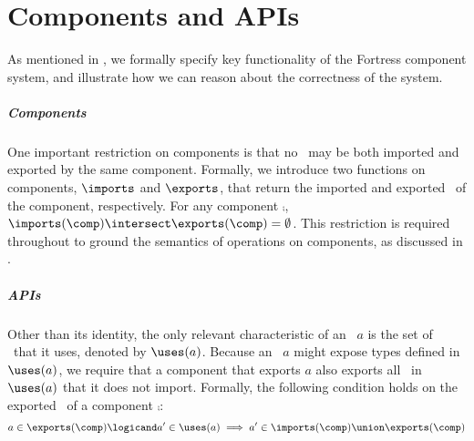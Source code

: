 %
%
%
%

\renewcommand{\api}{a}
\chapter{Components and APIs}


As mentioned in , 
we formally specify key functionality of the Fortress component system,
and illustrate how we can reason about the correctness of the system.

\paragraph{Components}
One important restriction on components is that no \apiN\ may be both
imported and exported by the same component.
Formally, we introduce two functions on components,
$\imports$ and $\exports$,
that return the imported and exported \apisN\ of the component, respectively.
For any component $\comp$, %
$\imports(\comp) \intersect \exports(\comp) = \emptyset$.
This restriction is required throughout to ground the semantics of
operations on components, as discussed in .

\paragraph{APIs}
Other than its identity,
the only relevant characteristic of an \apiN\ $\api$
is the set of \apisN\ that it uses,
denoted by $\uses(\api)$.
Because an \apiN\ $\api$ might expose types
defined in $\uses(\api)$,
we require that a component that exports $\api$
also exports all \apisN\ in $\uses(\api)$ that it does not import.
Formally, the following condition holds on the exported \apisN\
of a component $\comp$:
\[
\api \in \exports(\comp) \logicand \api' \in \uses(\api)
        \implies \api' \in \imports(\comp) \union \exports(\comp)
\]

